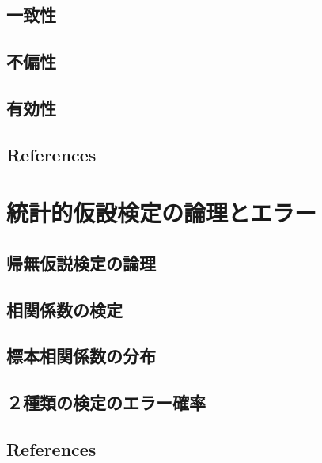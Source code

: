 \documentclass[
  a4paper,
]{ltjsbook}
\begin{document}
\section{一致性}\label{ux4e00ux81f4ux6027}

\section{不偏性}\label{ux4e0dux504fux6027}

\section{有効性}\label{ux6709ux52b9ux6027}

\section{References}\label{references-5}



\chapter{統計的仮設検定の論理とエラー}\label{ux7d71ux8a08ux7684ux4eeeux8a2dux691cux5b9aux306eux8ad6ux7406ux3068ux30a8ux30e9ux30fc}

\section{帰無仮説検定の論理}\label{ux5e30ux7121ux4eeeux8aacux691cux5b9aux306eux8ad6ux7406}

\section{相関係数の検定}\label{ux76f8ux95a2ux4fc2ux6570ux306eux691cux5b9a}

\section{標本相関係数の分布}\label{ux6a19ux672cux76f8ux95a2ux4fc2ux6570ux306eux5206ux5e03}

\section{２種類の検定のエラー確率}\label{ux7a2eux985eux306eux691cux5b9aux306eux30a8ux30e9ux30fcux78baux7387}

\section{References}\label{references-6}
\end{document}
